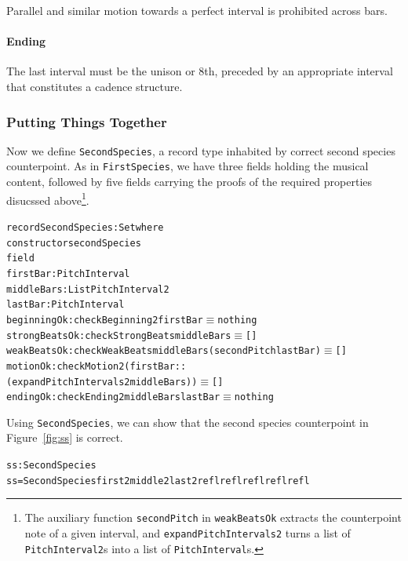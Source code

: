 Parallel and similar motion towards a perfect interval is prohibited
across bars.

\paragraph{Ending}

The last interval must be the unison or 8th, preceded by an
appropriate interval that constitutes a cadence structure.

\subsubsection{Putting Things Together}

Now we define \texttt{SecondSpecies}, a record type inhabited by
correct second species counterpoint.
As in \texttt{FirstSpecies}, we have three fields holding the musical
content, followed by five fields carrying the proofs of the required
properties disucssed above\footnote{
  The auxiliary function \texttt{secondPitch} in \texttt{weakBeatsOk}
  extracts the counterpoint note of a given interval, and
  \texttt{expandPitchIntervals2} turns a list of \texttt{PitchInterval2}s
  into a list of \texttt{PitchInterval}s.
}.

\begin{alltt}
record SecondSpecies : Set where
  constructor secondSpecies
  field
    firstBar      : PitchInterval 
    middleBars    : List PitchInterval2
    lastBar       : PitchInterval 
    beginningOk   : checkBeginning2 firstBar \(\equiv\) nothing
    strongBeatsOk : checkStrongBeats middleBars \(\equiv\) []
    weakBeatsOk   : checkWeakBeats middleBars (secondPitch lastBar) \(\equiv\) []
    motionOk      : checkMotion2 (firstBar ::
                                  (expandPitchIntervals2 middleBars)) \(\equiv\) []
    endingOk      : checkEnding2 middleBars lastBar \(\equiv\) nothing
\end{alltt}

Using \texttt{SecondSpecies}, we can show that the second species
counterpoint in Figure~\ref{fig:ss} is correct.

\begin{alltt}
ss : SecondSpecies
ss = SecondSpecies first2 middle2 last2 refl refl refl refl refl
\end{alltt}

